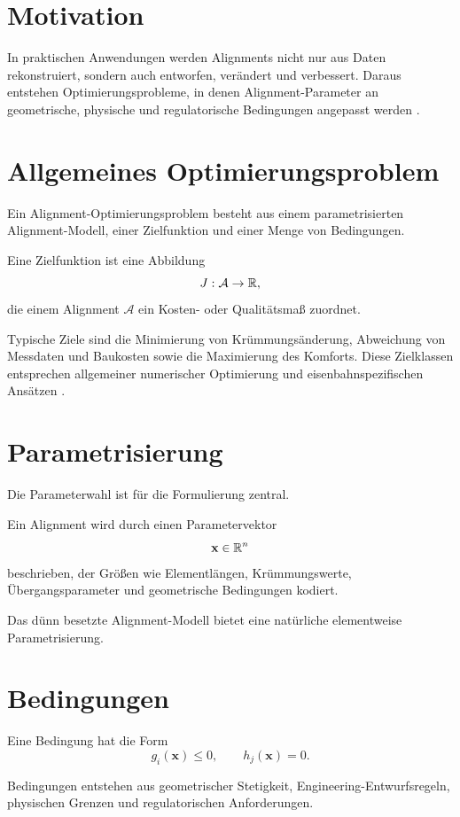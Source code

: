 \section*{Motivation}
In praktischen Anwendungen werden Alignments nicht nur aus Daten rekonstruiert,
sondern auch entworfen, verändert und verbessert. Daraus entstehen
Optimierungsprobleme, in denen Alignment-Parameter an geometrische, physische
und regulatorische Bedingungen angepasst werden
\cite{Kufver2000RailwayAlignment,Klein1998Trassierung}.

\section{Allgemeines Optimierungsproblem}
\begin{definition}
Ein Alignment-Optimierungsproblem besteht aus einem parametrisierten
Alignment-Modell, einer Zielfunktion und einer Menge von Bedingungen.
\end{definition}
\begin{definition}[Zielfunktion]
Eine Zielfunktion ist eine Abbildung
\[
J:\mathcal A\to\mathbb{R},
\]
die einem Alignment \(\mathcal A\) ein Kosten- oder Qualitätsmaß zuordnet.
\end{definition}
Typische Ziele sind die Minimierung von Krümmungsänderung, Abweichung von
Messdaten und Baukosten sowie die Maximierung des Komforts. Diese Zielklassen
entsprechen allgemeiner numerischer Optimierung
\cite{Nocedal2006NumericalOptimization} und eisenbahnspezifischen Ansätzen
\cite{Kufver2000RailwayAlignment}.

\section{Parametrisierung}
Die Parameterwahl ist für die Formulierung zentral.
\begin{definition}[Parametervektor]
Ein Alignment wird durch einen Parametervektor
\[
\mathbf x\in\mathbb{R}^n
\]
beschrieben, der Größen wie Elementlängen, Krümmungswerte,
Übergangsparameter und geometrische Bedingungen kodiert.
\end{definition}
Das dünn besetzte Alignment-Modell bietet eine natürliche elementweise
Parametrisierung.

\section{Bedingungen}
\begin{definition}[Bedingung]
Eine Bedingung hat die Form
\[
g_i(\mathbf x)\leq0,\qquad h_j(\mathbf x)=0.
\]
\end{definition}
Bedingungen entstehen aus geometrischer Stetigkeit,
Engineering-Entwurfsregeln, physischen Grenzen und regulatorischen
Anforderungen.

